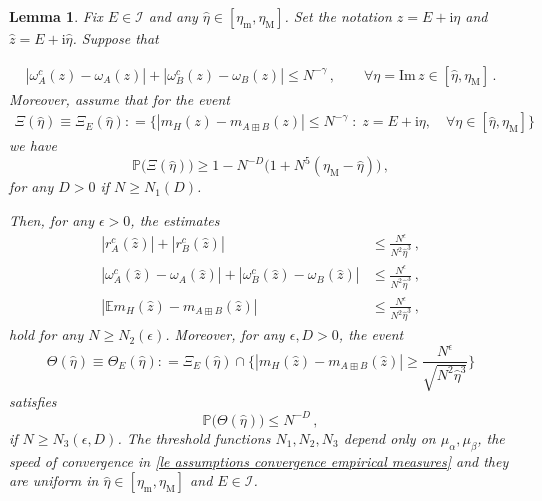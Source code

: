 \documentclass[10pt,reqno]{amsart}
\numberwithin{equation}{section}
\theoremstyle{plain}
\newtheorem{lemma}[theorem]{Lemma}
\numberwithin{kevin}{section}
\theoremstyle{remark}
\newcommand{\im}{\mathrm{Im}\,}
\renewcommand{\P}{{\mathbb P}}
\newcommand{\ii}{\mathrm{i}}
\newcommand{\deq}{\mathrel{\mathop:}=}
\newcommand{\wh}{\widehat}
\begin{document}
\begin{lemma} \label{lem071701}
Fix $E\in \mathcal{I}$ and any $\wh\eta \in [\eta_\mathrm{m},\eta_{\mathrm{M}}]$.
Set the notation $z=E+\ii \eta$ and $\widehat{z}=E+\ii \widehat{\eta}$. Suppose that 

\begin{align}
|\omega_A^c(z)-\omega_A(z)|+|\omega_B^c(z)-\omega_B(z)|\le N^{-\gamma}\, ,\qquad
\forall \eta=\im z \in [\widehat{\eta},\eta_{\mathrm{M}}]\,.
\label{071502}
\end{align} 
 Moreover, assume that for the event
\begin{align*}
 \Xi(\wh\eta)\equiv\Xi_E(\wh\eta)  \deq \Big\{ |m_H(z)-m_{A\boxplus B}(z)| \le N^{-\gamma} \; : \;  z=E+\ii \eta, \quad
   \forall\eta\in [\widehat{\eta},\eta_{\mathrm{M}}] \Big\}
   \end{align*}
we have
\begin{equation}\label{Xi}
   \P\big(\Xi(\wh\eta)\big) \ge 1-N^{-D}\big(1+N^5 (\eta_{\mathrm{M}}-\wh\eta)\big)\,,
\end{equation}
for any $D>0$ if $N\ge N_1(D)$.

Then, for any $\epsilon>0$, the estimates
\begin{align}
|r_A^c(\widehat{z})| + |r_B^c(\widehat{z})|&\le \frac{N^\epsilon}{N^2\widehat{\eta}^3}\,, \label{071501} \\
|\omega_A^c(\widehat{z})-\omega_A(\widehat{z})|+|\omega_B^c(\widehat{z})-\omega_B(\widehat{z})|&\le\frac{N^\epsilon}{N^2\widehat{\eta}^3}\,, \label{071518} \\
 |\mathbb{E}m_H(\widehat{z})-m_{A\boxplus B}(\widehat{z})| &\le\frac{N^\epsilon}{N^2\widehat{\eta}^3}\,, 
 \label{Emvar}
 \end{align}
 hold for any $N\ge N_2(\epsilon)$. Moreover, for any $\epsilon, D>0$, the event
 \begin{equation}\label{071519}
 \Theta(\wh\eta)\equiv \Theta_E(\wh\eta)\deq \Xi_E(\wh\eta) \cap \Big\{ |m_H(\widehat{z})-m_{A\boxplus B}(\widehat{z})|\ge \frac{N^\epsilon}{\sqrt{N^2\widehat{\eta}^3}} \Big\}
\end{equation}
 satisfies
\begin{equation}\label{Om}
\P\big( \Theta(\wh\eta)\big) \le N^{-D}\,,
\end{equation}
 if $N\ge N_3(\epsilon, D)$. The threshold functions $N_1, N_2, N_3$ depend only on $\mu_\alpha, \mu_\beta$, the
speed of convergence in \eqref{le assumptions convergence empirical measures} and they 
 are uniform in $\wh\eta\in  [\eta_\mathrm{m},\eta_{\mathrm{M}}]$ and $E\in\mathcal{I}$.
\end{lemma}
\end{document}
